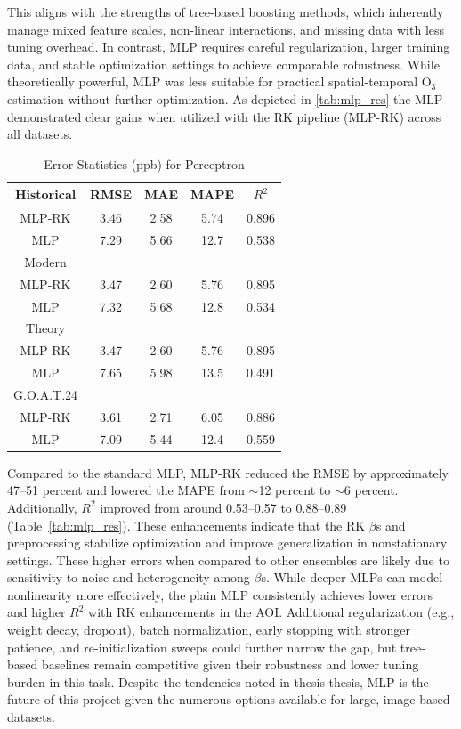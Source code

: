 This aligns with the strengths of tree-based boosting methods, which inherently manage mixed feature scales, non-linear interactions, and missing data with less tuning overhead. In contrast, MLP requires careful regularization, larger training data, and stable optimization settings to achieve comparable robustness. While theoretically powerful, MLP was less suitable for practical spatial-temporal O$_3$ estimation without further optimization. As depicted in \ref{tab:mlp_res} the MLP demonstrated clear gains when utilized with the RK pipeline (MLP-RK) across all datasets. \begin{table}[h!]
    \centering
        \begin{tabular}{||c|cccc||}
            \hline
            \textbf{Historical} & \textbf{RMSE} & \textbf{MAE} & \textbf{MAPE} & \textbf{$R^{2}$} \\[3pt]
            \hline 
            MLP-RK & 3.46 & 2.58 &  5.74 & 0.896 \\[3pt]
               MLP & 7.29 & 5.66 & 12.7  & 0.538 \\
            \hline
            Modern	&   &   &   &   \\[3pt]
            \hline
            MLP-RK &  3.47 & 2.60 &  5.76 & 0.895 \\[3pt]
               MLP &  7.32 & 5.68 & 12.8  & 0.534 \\ 
            \hline
            Theory	&   &   &   &   \\[3pt]
            \hline
            MLP-RK & 3.47 & 2.60 &  5.76 & 0.895 \\[3pt]
               MLP & 7.65 & 5.98 & 13.5  & 0.491 \\
            \hline
            G.O.A.T.24	&   &   &   &   \\[3pt]
            \hline
            MLP-RK & 3.61 & 2.71 &  6.05 & 0.886 \\[3pt]
               MLP & 7.09 & 5.44 & 12.4  & 0.559 \\
            \hline
        \end{tabular}
    \caption{Error Statistics (ppb) for Perceptron} 
    \label{tab:mlp_model_error}
\end{table} Compared to the standard MLP, MLP-RK reduced the RMSE by approximately 47–51 percent and lowered the MAPE from \(\sim\)12 percent to \(\sim\)6 percent. Additionally, \(R^2\) improved from around 0.53–0.57 to 0.88–0.89 (Table~\ref{tab:mlp_res}). These enhancements indicate that the RK $\beta$s and preprocessing stabilize optimization and improve generalization in nonstationary settings. These higher errors when compared to other ensembles are likely due to sensitivity to noise and heterogeneity among $\beta$s. While deeper MLPs can model nonlinearity more effectively, the plain MLP consistently achieves lower errors and higher \(R^2\) with RK enhancements in the AOI. Additional regularization (e.g., weight decay, dropout), batch normalization, early stopping with stronger patience, and re-initialization sweeps could further narrow the gap, but tree-based baselines remain competitive given their robustness and lower tuning burden in this task. Despite the tendencies noted in thesis thesis, MLP is the future of this project given the numerous options available for large, image-based datasets. 
